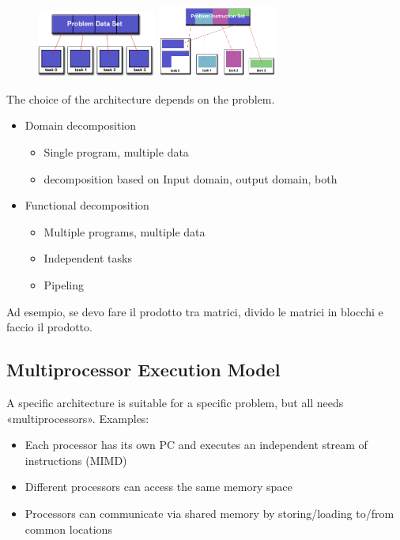 \begin{figure}
  \begin{center}
    \includegraphics[width=0.35\textwidth]{figure_parallel/decomposition1.png}
    \vspace{5mm}
    \includegraphics[width=0.35\textwidth]{figure_parallel/decomposition2.png}
  \end{center}
\end{figure}


The choice of the architecture depends on the problem.
\begin{itemize}
    \item Domain decomposition
    \begin{itemize}
        \item Single program, multiple data
        \item decomposition based on Input domain, output domain, both
    \end{itemize}
    \item Functional decomposition
        \begin{itemize}
        \item Multiple programs, multiple data
        \item Independent tasks
        \item Pipeling
    \end{itemize}
\end{itemize}

Ad esempio, se devo fare il prodotto tra matrici, divido le matrici in blocchi e faccio il prodotto.

\subsection{Multiprocessor Execution Model}
A specific architecture is suitable for a specific problem, but all needs «multiprocessors». Examples:
\begin{itemize}
    \item Each processor has its own PC and executes an independent stream of instructions (MIMD)
    \item Different processors can access the same memory space
    \item Processors can communicate via shared memory by storing/loading to/from common locations
\end{itemize}

